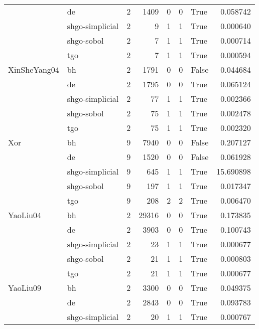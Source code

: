 \begin{longtable}{llrrrrlr}
         & de &     2 &     1409 &      0 &       0 &    True &    0.058742 \\
         & shgo-simplicial &     2 &        9 &      1 &       1 &    True &    0.000640 \\
         & shgo-sobol &     2 &        7 &      1 &       1 &    True &    0.000714 \\
         & tgo &     2 &        7 &      1 &       1 &    True &    0.000594 \\
XinSheYang04 & bh &     2 &     1791 &      0 &       0 &   False &    0.044684 \\
         & de &     2 &     1795 &      0 &       0 &    True &    0.065124 \\
         & shgo-simplicial &     2 &       77 &      1 &       1 &    True &    0.002366 \\
         & shgo-sobol &     2 &       75 &      1 &       1 &    True &    0.002478 \\
         & tgo &     2 &       75 &      1 &       1 &    True &    0.002320 \\
Xor & bh &     9 &     7940 &      0 &       0 &   False &    0.207127 \\
         & de &     9 &     1520 &      0 &       0 &   False &    0.061928 \\
         & shgo-simplicial &     9 &      645 &      1 &       1 &    True &   15.690898 \\
         & shgo-sobol &     9 &      197 &      1 &       1 &    True &    0.017347 \\
         & tgo &     9 &      208 &      2 &       2 &    True &    0.006470 \\
YaoLiu04 & bh &     2 &    29316 &      0 &       0 &    True &    0.173835 \\
         & de &     2 &     3903 &      0 &       0 &    True &    0.100743 \\
         & shgo-simplicial &     2 &       23 &      1 &       1 &    True &    0.000677 \\
         & shgo-sobol &     2 &       21 &      1 &       1 &    True &    0.000803 \\
         & tgo &     2 &       21 &      1 &       1 &    True &    0.000677 \\
YaoLiu09 & bh &     2 &     3300 &      0 &       0 &    True &    0.049375 \\
         & de &     2 &     2843 &      0 &       0 &    True &    0.093783 \\
         & shgo-simplicial &     2 &       20 &      1 &       1 &    True &    0.000767 \\

\end{longtable}
